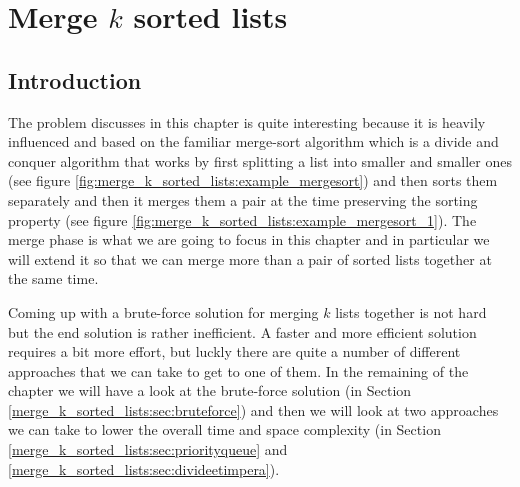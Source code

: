 %



\chapter{Merge $k$ sorted lists}
\label{ch:merge_k_sorted_lists}
\section*{Introduction}
The problem discusses in this chapter is quite interesting because it is heavily influenced and based on the familiar  merge-sort algorithm\cite{wiki:mergesort} which is a divide and conquer algorithm that works by first splitting a list into smaller and smaller ones (see figure \ref{fig:merge_k_sorted_lists:example_mergesort}) and then sorts them separately and then it merges them a pair at the time preserving the sorting property (see figure \ref{fig:merge_k_sorted_lists:example_mergesort_1}). 
The merge phase is what we are going to focus in this chapter and in particular we will extend it so that we can merge more than a pair of sorted lists together at the same time. 

Coming up with a brute-force solution for merging $k$ lists together is not hard but the end solution is rather inefficient. A faster and more efficient solution requires a bit more effort, but luckly there are quite a number of different approaches that we can take to get to one of them. In the remaining of the chapter we will have a look at the brute-force solution (in Section \ref{merge_k_sorted_lists:sec:bruteforce}) and then we will look at two approaches we can take to lower the overall time and space complexity (in Section \ref{merge_k_sorted_lists:sec:priorityqueue} and \ref{merge_k_sorted_lists:sec:divideetimpera}).


